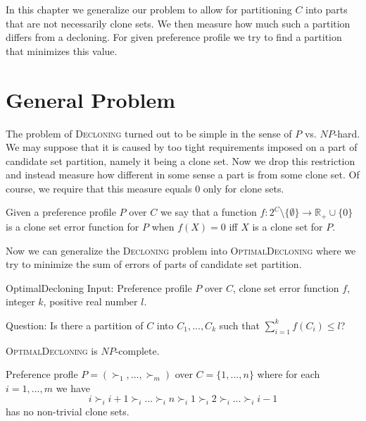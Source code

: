 In this chapter we generalize our problem to allow for partitioning $C$ into parts
that are not necessarily clone sets.
We then measure how much such a partition differs from a decloning.
For given preference profile we try to find a partition that minimizes this value.

\section{General Problem}

The problem of \textsc{Decloning} turned out to be simple in the sense of $P$ vs. $NP$-hard.
We may suppose that it is caused by too tight requirements imposed on a part of candidate set partition,
namely it being a clone set.
Now we drop this restriction and instead measure how different in some sense a part is from some clone set.
Of course, we require that this measure equals $0$ only for clone sets.

\begin{defn}
Given a preference profile $P$ over $C$ we say that a function
$f: 2^C \setminus \{\emptyset\} \rightarrow \mathbb{R}_+\cup\{0\}$
is a clone set error function for $P$ when $f(X) = 0$ iff $X$ is a clone set for $P$.
\end{defn}

Now we can generalize the \textsc{Decloning} problem into \textsc{OptimalDecloning}
where we try to minimize the sum of errors of parts of candidate set partition.


\begin{problem}{OptimalDecloning}
	Input: Preference profile $P$ over $C$, clone set error function $f$,
		integer $k$, positive real number $l$.

	Question: Is there a partition of $C$ into $C_1, ..., C_k$ such that $\sum_{i=1}^k f(C_i) \leq l$?
\end{problem}

\begin{thm} \label{optdecl}
	\textsc{OptimalDecloning} is $NP$-complete.
\end{thm}

\begin{lmm} \label{lmmnotrivial}
	Preference profle $P = (\succ_1, ... , \succ_m)$ over $C = \{1, ..., n\}$
	where for each $i=1,...,m$ we have
	$$i \succ_i i+1 \succ_i ... \succ_i n \succ_i 1 \succ_i 2 \succ_i ... \succ_i i-1$$
	has no non-trivial clone sets.
\end{lmm}

